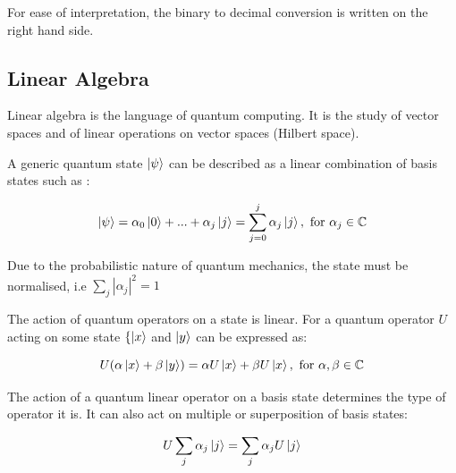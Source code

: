 \documentclass{article}
\begin{document}
For ease of interpretation, the binary to decimal conversion is written on the right hand side. 
\vspace{10mm}

\subsection{Linear Algebra}
\vspace{5mm}

\noindent
Linear algebra is the language of quantum computing. It is the study of vector spaces and of linear operations on vector
spaces (Hilbert space).
\vspace{5mm}

\noindent
A generic quantum state $\ket{\psi}$ can be described as a linear combination of basis states such as \cite{noauthor_lecture_nodate}:
\vspace{5mm}


\begin{equation}
\ket{\psi} = \alpha_0\ket{0} + ... + \alpha_j\ket{j} = \sum\limits_{j = 0}^{j} \alpha_j\ket{j} , \ \text{for} \ \alpha_j \in \mathbb{C}
\end{equation}
\vspace{5mm}

\noindent
Due to the probabilistic nature of quantum mechanics, the state must be normalised, i.e $\sum\limits_j |\alpha_j|^2 = 1$
\vspace{5mm}

\noindent
The action of quantum operators on a state is linear. For a quantum operator $U$ acting on some state $\{\ket{x}$ and $\ket{y}$ can be expressed as:
\vspace{5mm}

\noindent
\begin{equation}
U(\alpha\ket{x} + \beta\ket{y}) = \alpha U\ket{x} + \beta U\ket{x} , \ \text{for} \ \alpha, \beta \in \mathbb{C}
\end{equation}
\vspace{5mm}

\noindent
The action of a quantum linear operator on a basis state determines the type of operator it is. It can also act on multiple or superposition of basis states:
\vspace{5mm}

\noindent
\begin{equation}
U \sum\limits_j \alpha_j \ket{j} = \sum\limits_j \alpha_j U\ket{j}
\end{equation}
\vspace{10mm}
\end{document}
